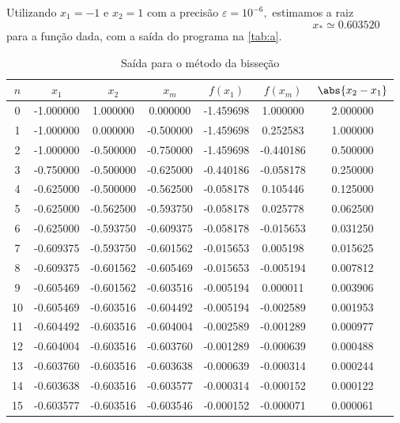 \documentclass[portuguese,minted]{artigo}
\begin{document}
    Utilizando \(x_1 = -1\) e \(x_2 = 1\) com a precisão \(\varepsilon = 10^{-6},\) estimamos a raiz
    \begin{equation*}
        x_* \simeq 0.603520
    \end{equation*}
    para a função dada, com a saída do programa na \cref{tab:a}.
    \begin{table}[H]
        \centering
        \caption{Saída para o método da bisseção}
        \begin{tabular}{c c c c c c c}
            \toprule
            \(n\) & \(x_1\) & \(x_2\) & \(x_m\) & \(f(x_1)\) & \(f(x_m)\) & \(\abs{x_2 - x_1}\)\\
            \midrule
             0 &-1.000000 & 1.000000 & 0.000000 &-1.459698 & 1.000000 &2.000000\\
             1 &-1.000000 & 0.000000 &-0.500000 &-1.459698 & 0.252583 &1.000000\\
             2 &-1.000000 &-0.500000 &-0.750000 &-1.459698 &-0.440186 &0.500000\\
             3 &-0.750000 &-0.500000 &-0.625000 &-0.440186 &-0.058178 &0.250000\\
             4 &-0.625000 &-0.500000 &-0.562500 &-0.058178 & 0.105446 &0.125000\\
             5 &-0.625000 &-0.562500 &-0.593750 &-0.058178 & 0.025778 &0.062500\\
             6 &-0.625000 &-0.593750 &-0.609375 &-0.058178 &-0.015653 &0.031250\\
             7 &-0.609375 &-0.593750 &-0.601562 &-0.015653 & 0.005198 &0.015625\\
             8 &-0.609375 &-0.601562 &-0.605469 &-0.015653 &-0.005194 &0.007812\\
             9 &-0.605469 &-0.601562 &-0.603516 &-0.005194 & 0.000011 &0.003906\\
            10 &-0.605469 &-0.603516 &-0.604492 &-0.005194 &-0.002589 &0.001953\\
            11 &-0.604492 &-0.603516 &-0.604004 &-0.002589 &-0.001289 &0.000977\\
            12 &-0.604004 &-0.603516 &-0.603760 &-0.001289 &-0.000639 &0.000488\\
            13 &-0.603760 &-0.603516 &-0.603638 &-0.000639 &-0.000314 &0.000244\\
            14 &-0.603638 &-0.603516 &-0.603577 &-0.000314 &-0.000152 &0.000122\\
            15 &-0.603577 &-0.603516 &-0.603546 &-0.000152 &-0.000071 &0.000061\\

\end{tabular}
\end{table}
\end{document}
